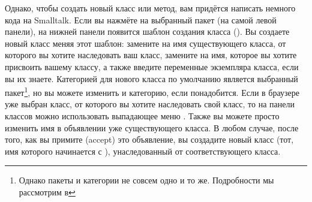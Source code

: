 \documentclass[a4paper,10pt,twoside]{book}
\begin{document}

Однако, чтобы создать новый класс или метод, вам придётся написать немного кода на Smalltalk. 
Если вы нажмёте на выбранный пакет (на самой левой панели), на нижней панели появится шаблон создания класса ().
Вы создаете новый класс меняя этот шаблон: замените  на имя существующего класса, от которого вы хотите наследовать ваш класс, замените  на имя, которое вы хотите присвоить вашему классу, а также введите переменные экземпляра класса, если вы их знаете.
Категорией для нового класса по умолчанию является выбранный пакет\footnote{Однако пакеты и категории не совсем одно и то же. Подробности мы рассмотрим в  }, но вы можете изменить и категорию, если понадобится.
Если в браузере уже выбран класс, от которого вы хотите наследовать свой класс, то на панели классов можно использовать выпадающее меню .
Также вы можете просто изменить имя в объявлении уже существующего класса. В любом случае, после того, как вы примите (accept) это объявление, вы создадите новый класс (тот, имя которого начинается с \ct{#}), унаследованный от соответствующего класса. 
\end{document}
